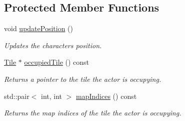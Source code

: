 \subsection*{Protected Member Functions}
\begin{DoxyCompactItemize}
\item 
void \mbox{\hyperlink{classRose_1_1Character_1_1Actor_ab0bb6eb9619dab556e682572c3ec9f95}{update\+Position}} ()
\begin{DoxyCompactList}\small\item\em Updates the characters position. \end{DoxyCompactList}\item 
\mbox{\hyperlink{classRose_1_1Tile}{Tile}} $\ast$ \mbox{\hyperlink{classRose_1_1Character_1_1Actor_a8a0a1dd7636a381483393049ff98f035}{occupied\+Tile}} () const
\begin{DoxyCompactList}\small\item\em Returns a pointer to the tile the actor is occupying. \end{DoxyCompactList}\item 
std\+::pair$<$ int, int $>$ \mbox{\hyperlink{classRose_1_1Character_1_1Actor_a98c5e21f71da3341eba49da5b55757e0}{map\+Indices}} () const
\begin{DoxyCompactList}\small\item\em Returns the map indices of the tile the actor is occupying. \end{DoxyCompactList}\end{DoxyCompactItemize}
